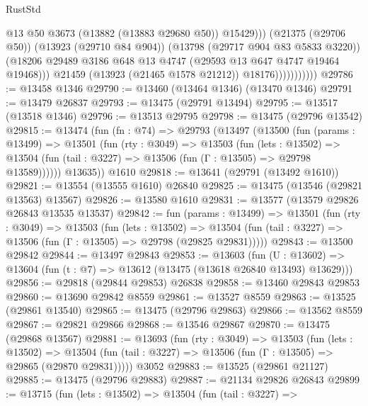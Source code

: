 \begin{lexlean}{RustStd}
\begin{coremodule}
                                  @13
                                  @50
                                  @3673
                                  (@13882 (@13883 @29680 @50))
                                  @15429)))
                            (@21375 (@29706 @50))
                            (@13923 (@29710 @84 @904))
                            (@13798 (@29717 @904 @83 @5833 @3220))
                            (@18206
                              @29489
                              @3186
                              @648
                              @13
                              @4747
                              (@29593 @13 @647 @4747 @19464 @19468)))
                          @21459
                          (@13923 (@21465 @1578 @21212))
                          @18176)))))))))))
@29786 := @13458 @1346
@29790 := @13460 (@13464 @1346) (@13470 @1346)
@29791 := @13479 @26837
@29793 := @13475 (@29791 @13494)
@29795 := @13517 (@13518 @1346)
@29796 := @13513 @29795
@29798 := @13475 (@29796 @13542)
@29815 := @13474
    (fun (fn : @74) =>
    @29793
      (@13497
        (@13500
          (fun (params : @13499) =>
          @13501
            (fun (rty : @3049) =>
            @13503
              (fun (lets : @13502) =>
              @13504 (fun (tail : @3227) => @13506 (fun (Γ : @13505) => @29798 @13589))))))
        @13635))
    @1610
@29818 := @13641 (@29791 (@13492 @1610))
@29821 := @13554 (@13555 @1610) @26840
@29825 := @13475 (@13546 (@29821 @13563) @13567)
@29826 := @13580 @1610
@29831 := @13577 (@13579 @29826 @26843 @13535 @13537)
@29842 := fun (params : @13499) =>
  @13501
    (fun (rty : @3049) =>
    @13503
      (fun (lets : @13502) =>
      @13504 (fun (tail : @3227) => @13506 (fun (Γ : @13505) => @29798 (@29825 @29831)))))
@29843 := @13500 @29842
@29844 := @13497 @29843
@29853 := @13603
    (fun (U : @13602) => @13604 (fun (t : @7) => @13612 (@13475 (@13618 @26840 @13493) @13629)))
@29856 := @29818 (@29844 @29853) @26838
@29858 := @13460 @29843 @29853
@29860 := @13690 @29842 @8559
@29861 := @13527 @8559
@29863 := @13525 (@29861 @13540)
@29865 := @13475 (@29796 @29863)
@29866 := @13562 @8559
@29867 := @29821 @29866
@29868 := @13546 @29867
@29870 := @13475 (@29868 @13567)
@29881 := @13693
    (fun (rty : @3049) =>
    @13503
      (fun (lets : @13502) =>
      @13504 (fun (tail : @3227) => @13506 (fun (Γ : @13505) => @29865 (@29870 @29831)))))
    @3052
@29883 := @13525 (@29861 @21127)
@29885 := @13475 (@29796 @29883)
@29887 := @21134 @29826 @26843
@29899 := @13715
    (fun (lets : @13502) =>
    @13504
      (fun (tail : @3227) =>

\end{coremodule}
\end{lexlean}
